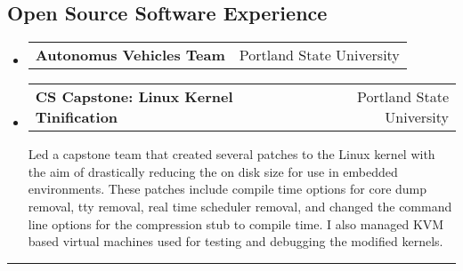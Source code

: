 \documentclass[10pt,letterpaper]{article}
\makeatletter
\newcommand{\heading}[2]
{\begin{tabular*}{\linewidth}{l@{\extracolsep{\fill}}r}
#1 &
#2 \\
\end{tabular*}}
\makeatother
\begin{document}
\subsection*{Open Source Software Experience}
	\begin{itemize}
		\item 
		\heading
			{\textbf{Autonomus Vehicles Team}}
			{Portland State University}
		\item 
		\heading
			{\textbf{CS Capstone: Linux Kernel Tinification}}
			{Portland State University}
			Led a capstone team that created several patches to the Linux kernel with the aim of drastically reducing the on disk size for use in embedded environments. These 					patches include compile time options for core dump removal, tty removal, real time scheduler removal, and changed the command line options for the compression stub to 				compile time. I also managed KVM based virtual machines used for testing and debugging the modified kernels.
	\end{itemize}

\hrule
\end{document}
